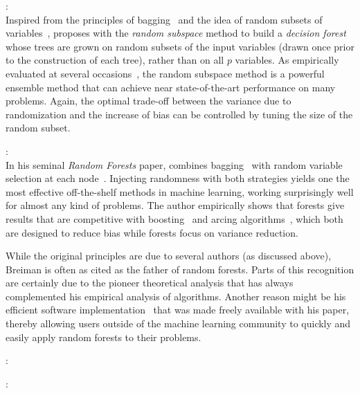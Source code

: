 \begin{description}
\item \citet{ho:1998}: \hfill \\
    Inspired from the principles of bagging~\citep{breiman:1996b} and the idea
    of random subsets of variables~\citep{amit:1997}, \citet{ho:1998} proposes
    with the \textit{random subspace} method to build a \textit{decision
    forest} whose trees are grown on random subsets of the input variables
    (drawn once prior to the construction of each tree), rather than on all $p$
    variables. As empirically evaluated at several
    occasions~\citep{ho:1998,panov:2007,louppe:2012}, the random subspace
    method is a powerful ensemble method that can achieve near state-of-the-art
    performance on many problems. Again, the optimal trade-off between the
    variance due to randomization  and the increase of bias can be controlled
    by tuning the size of the random subset.

\item \citet{breiman:2001}: \hfill \\
    In his seminal \textit{Random Forests} paper, \citet{breiman:2001} combines
    bagging~\citep{breiman:1996b} with random variable selection at each
    node~\citep{amit:1997}. Injecting randomness with both strategies  yields
    one the most effective off-the-shelf methods in machine learning, working
    surprisingly well for almost any kind of problems. The author empirically
    shows that forests give results that are competitive with
    boosting~\citep{freund:1995} and arcing algorithms~\citep{breiman:1996},
    which both are designed to reduce bias while forests focus on variance
    reduction.

    While the original principles are due to several authors (as discussed
    above), Breiman is often as cited as the father of random forests. Parts of
    this recognition are certainly due to the pioneer theoretical analysis that
    has always complemented his empirical analysis of algorithms. Another
    reason might be his efficient software implementation~\citep{breiman:2002}
    that was made freely available with his paper, thereby allowing users
    outside of the machine learning community to quickly and easily apply
    random forests to their problems.

\item \citet{geurts:2006}: \hfill \\

\item \citet{strobl:2007}: \hfill \\

\end{description}


